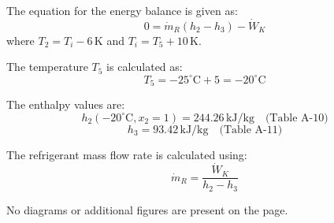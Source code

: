 The equation for the energy balance is given as:  
\[
0 = \dot{m}_R (h_2 - h_3) - \dot{W}_K
\]  
where \( T_2 = T_i - 6 \, \text{K} \) and \( T_i = T_5 + 10 \, \text{K} \).  

The temperature \( T_5 \) is calculated as:  
\[
T_5 = -25^\circ\text{C} + 5 = -20^\circ\text{C}
\]  

The enthalpy values are:  
\[
h_2(-20^\circ\text{C}, x_2 = 1) = 244.26 \, \text{kJ/kg} \quad \text{(Table A-10)}
\]  
\[
h_3 = 93.42 \, \text{kJ/kg} \quad \text{(Table A-11)}
\]  

The refrigerant mass flow rate is calculated using:  
\[
\dot{m}_R = \frac{\dot{W}_K}{h_2 - h_3}
\]  

No diagrams or additional figures are present on the page.